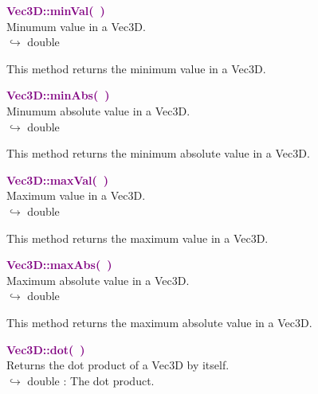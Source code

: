 \textcolor{purple}{\textbf{Vec3D::minVal(~)}}\label{Vec3D::minVal()}\\
Minumum value in a Vec3D.\\ \hspace*{10mm}$\hookrightarrow$ double

This method returns the minimum value in a Vec3D.

\textcolor{purple}{\textbf{Vec3D::minAbs(~)}}\label{Vec3D::minAbs()}\\
Minumum absolute value in a Vec3D.\\ \hspace*{10mm}$\hookrightarrow$ double

This method returns the minimum absolute value in a Vec3D.

\textcolor{purple}{\textbf{Vec3D::maxVal(~)}}\label{Vec3D::maxVal()}\\
Maximum value in a Vec3D.\\ \hspace*{10mm}$\hookrightarrow$ double

This method returns the maximum value in a Vec3D.

\textcolor{purple}{\textbf{Vec3D::maxAbs(~)}}\label{Vec3D::maxAbs()}\\
Maximum absolute value in a Vec3D.\\ \hspace*{10mm}$\hookrightarrow$ double

This method returns the maximum absolute value in a Vec3D.

\textcolor{purple}{\textbf{Vec3D::dot(~)}}\label{Vec3D::dot()}\\
Returns the dot product of a Vec3D by itself.\\ \hspace*{10mm}$\hookrightarrow$ double : The dot product.

